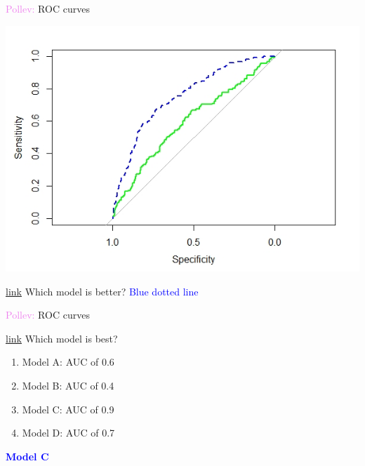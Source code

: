 \documentclass[10pt,t]{beamer}
\begin{document}
\begin{frame}{\textcolor{violet}{Pollev:} ROC curves}
	
	\vspace{-7 mm}
	
	\begin{center}
	\includegraphics[scale = 0.6]{figs/roc_question}
\end{center}	

	\textcolor{violet}{\href{https://PollEv.com/multiple_choice_polls/bPijp7LawjdacrRp7AfVW/respond}{link}} Which model is better? \pause\textcolor{blue}{Blue dotted line}
\end{frame}


\begin{frame}{\textcolor{violet}{Pollev:} ROC curves}
	
	\textcolor{violet}{\href{https://PollEv.com/multiple_choice_polls/Mk1x5GCgquXHf2TBw8cFf/respond}{link}} Which model is best?
	
	\bigskip
	
	\begin{enumerate}
		\item Model A: AUC of 0.6
		\medskip
		\item Model B: AUC of 0.4
		\medskip
		\item Model C: AUC of 0.9
		\medskip
		\item  Model D: AUC of 0.7
	\end{enumerate}
\pause
	\bigskip
	\textbf{\textcolor{blue}{Model C}}
\end{frame}
\end{document}
